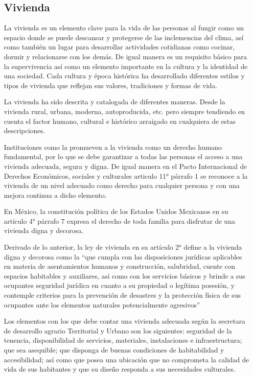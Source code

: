 \subsection{Vivienda}
La vivienda es un elemento clave para la vida de las personas al fungir como un espacio donde se puede descansar y protegerse de las inclemencias del clima, así como también un lugar para desarrollar actividades cotidianas como cocinar, dormir y relacionarse con los demás. De igual manera es un requisito básico para la supervivencia así como un elemento importante en la cultura y la identidad de una sociedad. Cada cultura y época histórica ha desarrollado diferentes estilos y tipos de vivienda que reflejan sus valores, tradiciones y formas de vida.

La vivienda ha sido descrita y catalogada de diferentes maneras. Desde la vivienda rural, urbana, moderna, autoproducida, etc. pero siempre tendiendo en cuenta el factor humano, cultural e histórico arraigado en cualquiera de estas descripciones.

Instituciones como la \cite*{de1948declaracion} promueven a la vivienda como un derecho humano fundamental, por lo que se debe garantizar a todas las personas el acceso a una vivienda adecuada, segura y digna. De igual manera en el Pacto Internacional de Derechos Económicos, sociales y culturales \citep{humanos2012pacto} articulo 11° párrafo 1 se reconoce a la vivienda de un nivel adecuado como derecho para cualquier persona y con una mejora continua a dicho elemento.

En México, la constitución política de los Estados Unidos Mexicanos \citep{constitucion1917politica} en su artículo 4° párrafo 7 expresa el derecho de toda familia para disfrutar de una vivienda digna y decorosa.

Derivado de lo anterior, la ley de vivienda \citep{leyvivienda2019} en su artículo 2° define a la vivienda digna y decorosa como la ``que cumpla con las disposiciones jurídicas aplicables en materia de asentamientos humanos y construcción, salubridad, cuente con espacios habitables y auxiliares, así como con los servicios básicos y brinde a sus ocupantes seguridad jurídica en cuanto a su propiedad o legítima posesión, y contemple criterios para la prevención de desastres y la protección física de sus ocupantes ante los elementos naturales potencialmente agresivos''

Los elementos con los que debe contar una vivienda adecuada según la secretara de desarrollo agrario Territorial y Urbano \citep{reglas2021operacion} son los siguientes: seguridad de la tenencia, disponibilidad de servicios, materiales, instalaciones e infraestructura; que sea asequible; que disponga de buenas condiciones de habitabilidad y accesibilidad; así como que posea una ubicación que no comprometa la calidad de vida de sus habitantes y que su diseño responda a sus necesidades culturales.

